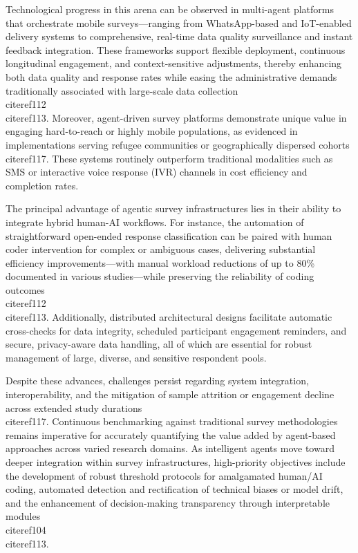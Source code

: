 \documentclass[11pt]{article}
\begin{document}
Technological progress in this arena can be observed in multi-agent platforms that orchestrate mobile surveys—ranging from WhatsApp-based and IoT-enabled delivery systems to comprehensive, real-time data quality surveillance and instant feedback integration. These frameworks support flexible deployment, continuous longitudinal engagement, and context-sensitive adjustments, thereby enhancing both data quality and response rates while easing the administrative demands traditionally associated with large-scale data collection \\cite{ref112}\\cite{ref113}. Moreover, agent-driven survey platforms demonstrate unique value in engaging hard-to-reach or highly mobile populations, as evidenced in implementations serving refugee communities or geographically dispersed cohorts \\cite{ref117}. These systems routinely outperform traditional modalities such as SMS or interactive voice response (IVR) channels in cost efficiency and completion rates.

The principal advantage of agentic survey infrastructures lies in their ability to integrate hybrid human-AI workflows. For instance, the automation of straightforward open-ended response classification can be paired with human coder intervention for complex or ambiguous cases, delivering substantial efficiency improvements—with manual workload reductions of up to 80\% documented in various studies—while preserving the reliability of coding outcomes \\cite{ref112}\\cite{ref113}. Additionally, distributed architectural designs facilitate automatic cross-checks for data integrity, scheduled participant engagement reminders, and secure, privacy-aware data handling, all of which are essential for robust management of large, diverse, and sensitive respondent pools.

Despite these advances, challenges persist regarding system integration, interoperability, and the mitigation of sample attrition or engagement decline across extended study durations \\cite{ref117}. Continuous benchmarking against traditional survey methodologies remains imperative for accurately quantifying the value added by agent-based approaches across varied research domains. As intelligent agents move toward deeper integration within survey infrastructures, high-priority objectives include the development of robust threshold protocols for amalgamated human/AI coding, automated detection and rectification of technical biases or model drift, and the enhancement of decision-making transparency through interpretable modules \\cite{ref104}\\cite{ref113}.
\end{document}
